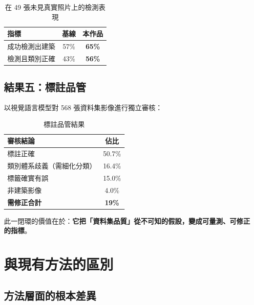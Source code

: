 \documentclass[11pt,a4paper,fontset=windows]{ctexart}
\newcommand{\hl}[1]{\textbf{\color{gold}#1}}
\begin{document}
\begin{table}[H]
\centering
\small
\caption{在 49 張未見真實照片上的檢測表現}
\begin{tabular}{lcc}
\toprule
\textbf{指標} & \textbf{基線} & \textbf{本作品} \\
\midrule
成功檢測出建築 & 57\% & \hl{65\%} \\
檢測且類別正確 & 43\% & \hl{56\%} \\
\bottomrule
\end{tabular}
\end{table}

\subsection{結果五：標註品管}

以視覺語言模型對 568 張資料集影像進行獨立審核：

\begin{table}[H]
\centering
\small
\caption{標註品管結果}
\begin{tabular}{lc}
\toprule
\textbf{審核結論} & \textbf{佔比} \\
\midrule
標註正確 & 50.7\% \\
類別體系歧義（需細化分類） & 16.4\% \\
標籤確實有誤 & 15.0\% \\
非建築影像 & 4.0\% \\
\midrule
\textbf{需修正合計} & \hl{19\%} \\
\bottomrule
\end{tabular}
\end{table}

此一閉環的價值在於：\textbf{它把「資料集品質」從不可知的假設，變成可量測、可修正的指標}。

\section{與現有方法的區別}

\subsection{方法層面的根本差異}
\end{document}
